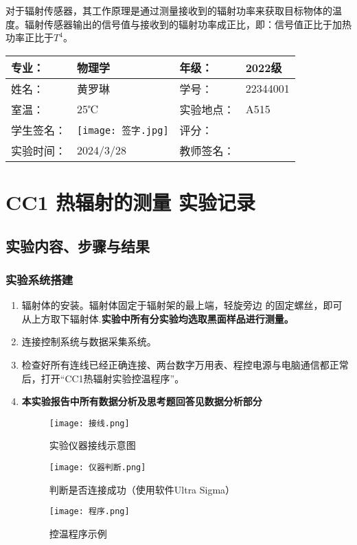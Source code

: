 \documentclass[dvipsnames, svgnames,a4paper,11pt]{article}
\begin{document}
	对于辐射传感器，其工作原理是通过测量接收到的辐射功率来获取目标物体的温度。辐射传感器输出的信号值与接收到的辐射功率成正比，即：信号值正比于加热功率正比于$T^{4}$。
	
	
	
	
	
	\clearpage
	
	\begin{table}
		\renewcommand\arraystretch{1.7}
		\centering
		\begin{tabularx}{\textwidth}{|X|X|X|X|}
			\hline
			专业： & 物理学 & 年级： & 2022级 \\
			\hline
			姓名： & 黄罗琳 & 学号： & 22344001\\
			\hline
			室温： & 25℃ & 实验地点： & A515 \\
			\hline
			学生签名：&\texttt{[image: 签字.jpg]}  & 评分： &\\
			\hline
			实验时间：& 2024/3/28 & 教师签名：&\\
			\hline
		\end{tabularx}
	\end{table}
	
	\section{CC1 热辐射的测量 \quad\heiti 实验记录}
	
	\subsection{实验内容、步骤与结果}
	
	\subsubsection{实验系统搭建}
	\begin{enumerate}
		\item 辐射体的安装。辐射体固定于辐射架的最上端，轻旋旁边
		的固定螺丝，即可从上方取下辐射体.\textbf{实验中所有分实验均选取黑面样品进行测量。}
		\item 连接控制系统与数据采集系统。
		\item 检查好所有连线已经正确连接、两台数字万用表、程控电源与电脑通信都正常后，打开“CC1热辐射实验控温程序”。
		\item \textbf{本实验报告中所有数据分析及思考题回答见数据分析部分}
		\begin{figure}[{H}]
			\centering
			\texttt{[image: 接线.png]}
			\caption{实验仪器接线示意图}
			\label{}
		\end{figure}
		\begin{figure}[{H}]
			\centering
			\texttt{[image: 仪器判断.png]}
			\caption{判断是否连接成功（使用软件Ultra
			Sigma）}
			\label{}
		\end{figure}
		\begin{figure}[{H}]
			\centering
			\texttt{[image: 程序.png]}
			\caption{控温程序示例}
			\label{}
		\end{figure}
	\end{enumerate}
	 
\end{document}
